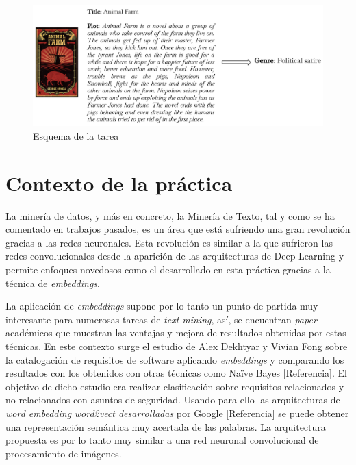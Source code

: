 \documentclass[12pt,a4paper, xcolor=table]{article}
\begin{document}
\vspace{12mm}

  \begin{figure}[!h]
    \centering
    \includegraphics[width=450px]{img/Animal Farm.png}
    \caption{Esquema de la tarea}
    \end{figure}

\newpage

\section{Contexto de la práctica}
La minería de datos, y más en concreto, la Minería de Texto, tal y como se ha comentado en trabajos pasados, es un área que está sufriendo una gran revolución gracias a las redes neuronales. Esta revolución es similar a la que sufrieron las redes convolucionales desde la aparición de las arquitecturas de Deep Learning y permite enfoques novedosos como el desarrollado en esta práctica gracias a la técnica de \textit{embeddings}. 

\vspace{3mm}

La aplicación de \textit{embeddings} supone por lo tanto un punto de partida muy interesante para numerosas tareas de \textit{text-mining}, así, se encuentran \textit{paper} académicos que muestran las ventajas y mejora de resultados obtenidas por estas técnicas. En este contexto surge el estudio de Alex Dekhtyar y Vivian Fong sobre la catalogación de requisitos de software aplicando \textit{embeddings} y comparando los resultados con los obtenidos con otras técnicas como Naïve Bayes [Referencia]. El objetivo de dicho estudio era realizar clasificación sobre requisitos relacionados y no relacionados con asuntos de seguridad. Usando para ello las arquitecturas de\textit{ word embedding }\textit{word2vect desarrolladas} por Google [Referencia] se puede obtener una representación semántica muy acertada de las palabras. La arquitectura propuesta es por lo tanto muy similar a una red neuronal convolucional de procesamiento de imágenes.
\end{document}
